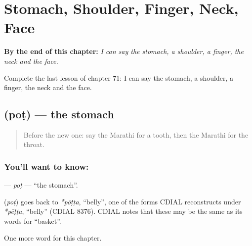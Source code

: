 
\chapter{Stomach, Shoulder, Finger, Neck, Face}
\label{ch:mr-stomach-shoulder-finger-neck-face}

\begin{chapteropening}
\textbf{By the end of this chapter:} \emph{I can say the stomach, a shoulder, a finger, the neck and the face.}

Complete the last lesson of chapter 71: I can say the stomach, a shoulder, a finger, the neck and the face.
\end{chapteropening}

\section[\texorpdfstring{\mr{पोट} (poṭ)}{पोट (poṭ)}]{ (poṭ) — the stomach}

\label{lesson:MR-C71-pot}



\begin{quote}
Before the new one: say the Marathi for a tooth, then the Marathi for the throat.
\end{quote}

\subsection*{You'll want to know: }
\textbf{} — \emph{poṭ} — \textquotedblleft{}the stomach\textquotedblright{}.

\begin{cousinweb}
\textbf{} (\emph{poṭ}) goes back to \emph{*pōṭṭa}, \textquotedblleft{}belly\textquotedblright{}, one of the forms CDIAL reconstructs under \emph{*pēṭṭa}, \textquotedblleft{}belly\textquotedblright{} (CDIAL 8376). CDIAL notes that these may be the same as its words for \textquotedblleft{}basket\textquotedblright{}.
\end{cousinweb}

\begin{grammarlens}[title={What you've built}]
One more word for this chapter.
\end{grammarlens}

